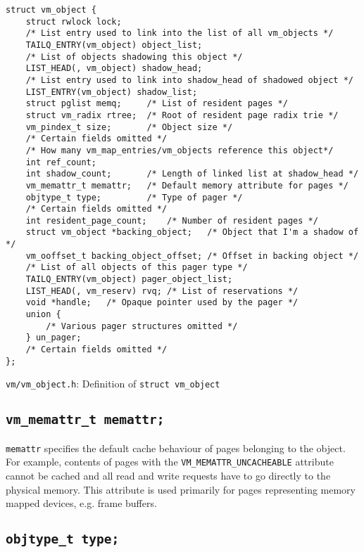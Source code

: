 \documentclass[shortabstract, english]{iithesis}
\begin{document}
\begin{listing}[H]
\begin{verbatim}
struct vm_object {
    struct rwlock lock;
    /* List entry used to link into the list of all vm_objects */
    TAILQ_ENTRY(vm_object) object_list;
    /* List of objects shadowing this object */
    LIST_HEAD(, vm_object) shadow_head;
    /* List entry used to link into shadow_head of shadowed object */
    LIST_ENTRY(vm_object) shadow_list;
    struct pglist memq;     /* List of resident pages */
    struct vm_radix rtree;  /* Root of resident page radix trie */
    vm_pindex_t size;       /* Object size */
    /* Certain fields omitted */
    /* How many vm_map_entries/vm_objects reference this object*/
    int ref_count;
    int shadow_count;       /* Length of linked list at shadow_head */
    vm_memattr_t memattr;   /* Default memory attribute for pages */
    objtype_t type;         /* Type of pager */
    /* Certain fields omitted */
    int resident_page_count;    /* Number of resident pages */
    struct vm_object *backing_object;   /* Object that I'm a shadow of */
    vm_ooffset_t backing_object_offset; /* Offset in backing object */
    /* List of all objects of this pager type */
    TAILQ_ENTRY(vm_object) pager_object_list;
    LIST_HEAD(, vm_reserv) rvq; /* List of reservations */
    void *handle;   /* Opaque pointer used by the pager */
    union {
        /* Various pager structures omitted */
    } un_pager;
    /* Certain fields omitted */
};
\end{verbatim}
\caption{\texttt{vm/vm\_object.h}: Definition of \texttt{struct vm_object}}
\end{listing}

\subsection*{\texttt{vm_memattr_t memattr;}}

\texttt{memattr} specifies the default cache behaviour \cite[Section~11.3]{bib:intel} of pages belonging
to the object. For example, contents of pages with the
\texttt{VM_MEMATTR_UNCACHEABLE} attribute cannot be cached and all read
and write requests have to go directly to the physical memory. This attribute is
used primarily for pages representing memory mapped devices, e.g. frame buffers.

\subsection*{\texttt{objtype_t type;}}
\end{document}
